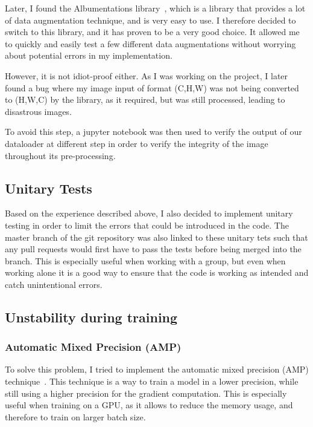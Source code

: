 \documentclass[11pt]{article}
\begin{document}
        Later, I found the Albumentations library~\cite{albumentations}, which is a library that provides a lot of data augmentation technique, and is very easy to use. I therefore decided to switch to this library, and it has proven to be a very good choice.
        It allowed me to quickly and easily test a few different data augmentations without worrying about potential errors in my implementation.

        However, it is not idiot-proof either. As I was working on the project, I later found a bug where my image input of format (C,H,W) was not being converted to (H,W,C) by the library, as it required, but was still processed, leading to disastrous images.

        To avoid this step, a jupyter notebook was then used to verify the output of our dataloader at different step in order to verify the integrity of the image
        throughout its pre-processing.

    \subsection{Unitary Tests}

            Based on the experience described above, I also decided to implement unitary testing in order to limit the errors
            that could be introduced in the code. The master branch of the git repository was also linked to these unitary tets such that
            any pull requests would first have to pass the tests before being merged into the branch. This is especially useful when working with a group,
            but even when working alone it is a good way to ensure that the code is working as intended and catch unintentional errors.


    \subsection{Unstability during training}

    \subsubsection{Automatic Mixed Precision (AMP)}

            To solve this problem, I tried to implement the automatic mixed precision (AMP) technique~\cite{automatic_mixed_precision}. This technique is a way to train a model in a lower precision, while still using a higher precision for the gradient computation.
            This is especially useful when training on a GPU, as it allows to reduce the memory usage, and therefore to train on larger batch size.
\end{document}
